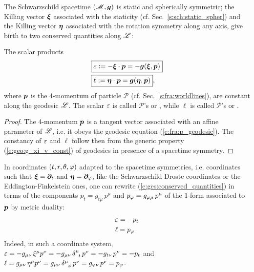 The Schwarzschild spacetime $(\mathscr{M},\bm{g})$ is static and spherically symmetric; the
Killing vector $\bm{\xi}$ associated with the staticity (cf. Sec.~\ref{s:sch:static_spher})
and the Killing vector $\bm{\eta}$ associated with the rotation symmetry along any
axis, give birth to two conserved quantities along $\mathscr{L}$:
\begin{greybox}
The scalar products
\begin{subequations}
\label{e:ges:conserved_quantities}
\begin{align}
& \fbox{$\displaystyle \varepsilon := - \bm{\xi}\cdot \bm{p} = - \bm{g}(\bm{\xi},\bm{p}) $} \label{e:ges:conserved_energy} \\
& \fbox{$\displaystyle \ell := \bm{\eta}\cdot \bm{p} = \bm{g}(\bm{\eta},\bm{p}) $} , \label{e:ges:conserved_angu_mom}
\end{align}
\end{subequations}
where $\bm{p}$ is the 4-momentum of particle
$\mathscr{P}$ (cf. Sec.~\ref{s:fra:worldlines}),
are constant along the geodesic $\mathscr{L}$.
The scalar $\varepsilon$ is called $\mathscr{P}$'s
or ,
while $\ell$ is called $\mathscr{P}$'s 
or .
\end{greybox}
\begin{proof}
The 4-momentum $\bm{p}$ is a tangent vector associated with an affine parameter
of $\mathscr{L}$, i.e. it obeys the geodesic equation (\ref{e:fra:p_geodesic}).
The constancy of $\varepsilon$ and $\ell$ follow then from the generic property (\ref{e:geo:g_xi_v_const})
of geodesics in presence of a spacetime symmetry.
\end{proof}
In coordinates $(t,r,\theta,\varphi)$ adapted to the spacetime symmetries,
i.e. coordinates such that $\bm{\xi} = \bm{\partial}_t$ and $\bm{\eta}=\bm{\partial}_\varphi$, like the Schwarzschild-Droste
coordinates or the Eddington-Finkelstein ones, one can rewrite
(\ref{e:ges:conserved_quantities})
in terms of the components $p_t = g_{t\mu} \, p^\mu$ and $p_\varphi = g_{\varphi\mu} \, p^\mu$
of the 1-form associated to $\bm{p}$ by metric duality:
\begin{subequations}
\begin{align}
& \varepsilon = - p_t \\
& \ell = p_\varphi
\end{align}
\end{subequations}
Indeed, in such a coordinate system, $\varepsilon = -g_{\mu\nu} \, \xi^\mu p^\nu = -g_{\mu\nu}\,  \delta^\mu_{\ \, t} \, p^\nu = -g_{t\nu} \, p^\nu = -p_t$
and $\ell = g_{\mu\nu} \, \eta^\mu p^\nu = g_{\mu\nu}\,  \delta^\mu_{\ \, \varphi} \, p^\nu = g_{\varphi\nu} \, p^\nu = p_\varphi$.


